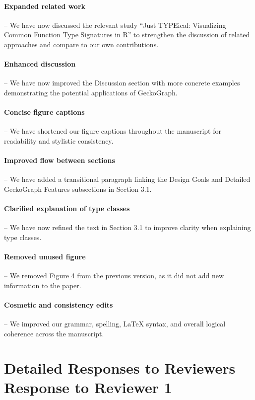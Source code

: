 \documentclass{article}
\begin{document}
\paragraph{Expanded related work} – We have now discussed the relevant study “Just TYPEical: Visualizing Common Function Type Signatures in R” to strengthen the discussion of related approaches and compare to our own contributions.

\paragraph{Enhanced discussion} – We have now improved the Discussion section with more concrete examples demonstrating the potential applications of GeckoGraph.

\paragraph{Concise figure captions} – We have shortened our figure captions throughout the manuscript for readability and stylistic consistency.

\paragraph{Improved flow between sections} – We have added a transitional paragraph linking the Design Goals and Detailed GeckoGraph Features subsections in Section 3.1.

\paragraph{Clarified explanation of type classes} – We have now refined the text in Section 3.1 to improve clarity when explaining type classes.

\paragraph{Removed unused figure} – We removed Figure 4 from the previous version, as it did not add new information to the paper.

\paragraph{Cosmetic and consistency edits} – We improved our grammar, spelling, LaTeX syntax, and overall logical coherence across the manuscript.

\section{Detailed Responses to Reviewers
Response to Reviewer 1}
\end{document}
